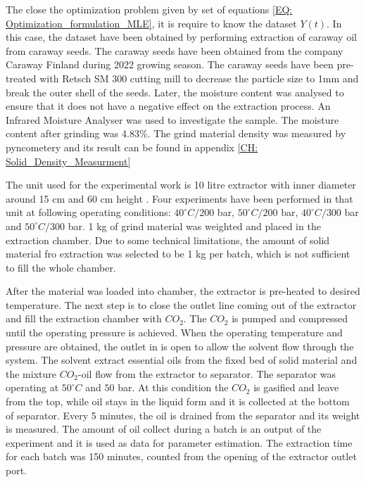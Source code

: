 \documentclass[../Article_Model_Parameters.tex]{subfiles}
\begin{document}
	
	\label{CH: Experiments}
	
	The close the optimization problem given by set of equations \ref{EQ: Optimization_formulation_MLE}, it is require to know the dataset $Y(t)$. In this case, the dataset have been obtained by performing extraction of caraway oil from caraway seeds. The caraway seeds have been obtained from the company Caraway Finland during 2022 growing season. The caraway seeds have been pre-treated with Retsch SM 300 cutting mill to decrease the particle size to 1mm and break the outer shell of the seeds. Later, the moisture content was analysed to ensure that it does not have a negative effect on the extraction process. An Infrared Moisture Analyser was used to investigate the sample. The moisture content after grinding was 4.83\%. The grind material density was measured by pyncometery and its result can be found in appendix \ref{CH: Solid_Density_Measurment}
	
	The unit used for the experimental work is 10 litre extractor  with inner diameter around 15 cm and 60 cm height . Four experiments have been performed in that unit at following operating conditions: $40^\circ C / 200$ bar, $50^\circ C / 200$ bar, $40^\circ C / 300$ bar and $50^\circ C / 300$ bar. 1 kg of grind material was weighted and placed in the extraction chamber. Due to some technical limitations, the amount of solid material fro extraction was selected to be 1 kg per batch, which is not sufficient to fill the whole chamber.
	
	After the material was loaded into chamber, the extractor is pre-heated to desired temperature. The next step is to close the outlet line coming out of the extractor and fill the extraction chamber with $CO_2$. The $CO_2$ is pumped and compressed until the operating pressure is achieved. When the operating temperature and pressure are obtained, the outlet in is open to allow the solvent flow through the system. The solvent extract essential oils from the fixed bed of solid material and the mixture $CO_2$-oil flow from the extractor to separator. The separator was operating at $50^\circ C$ and $50$ bar. At this condition the $CO_2$ is gasified and leave from the top, while oil stays in the liquid form and it is collected at the bottom of separator. Every 5 minutes, the oil is drained from the separator and its weight is measured. The amount of oil collect during a batch is an output of the experiment and it is used as data for parameter estimation. The extraction time for each batch was 150 minutes, counted from the opening of the extractor outlet port.
	
\end{document}
